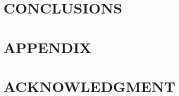 \documentclass[letterpaper, 10 pt, conference]{ieeeconf}  %
\begin{document}
   
\section{CONCLUSIONS}



\addtolength{\textheight}{-12cm}   %


\section*{APPENDIX}



\section*{ACKNOWLEDGMENT}



{
}
\end{document}
